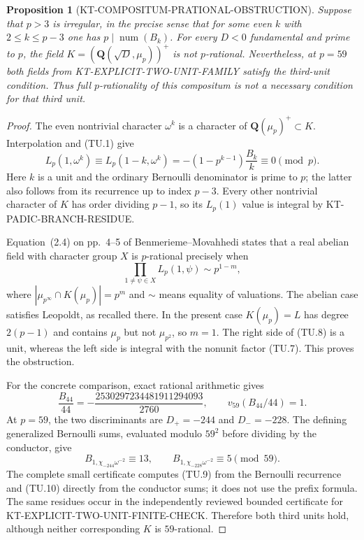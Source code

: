 \documentclass[11pt,a4paper]{article}
\newtheorem{proposition}[theorem]{Proposition}
\theoremstyle{definition}
\begin{document}
\begin{proposition}[KT-COMPOSITUM-PRATIONAL-OBSTRUCTION]
Suppose that $p>3$ is irregular, in the precise sense that for
some even $k$ with $2\le k\le p-3$ one has
$p\mid\operatorname{num}(B_k)$.  For every $D<0$ fundamental
and prime to $p$, the field
$K=(\mathbf Q(\sqrt D,\mu_p))^+$ is not $p$-rational.
Nevertheless, at $p=59$ both fields from
KT-EXPLICIT-TWO-UNIT-FAMILY satisfy the third-unit condition.
Thus full $p$-rationality of this compositum is not a necessary
condition for that third unit.
\end{proposition}
\begin{proof}
The even nontrivial character $\omega^k$ is a character of
$\mathbf Q(\mu_p)^+\subset K$.  Interpolation and (TU.1) give
\[
 L_p(1,\omega^k)\equiv L_p(1-k,\omega^k)
       =-(1-p^{k-1})\frac{B_k}{k}\equiv0\pmod p.          \tag{TU.7}
\]
Here $k$ is a unit and the ordinary Bernoulli denominator is
prime to $p$; the latter also follows from its recurrence up
to index $p-3$.  Every other nontrivial character of $K$ has
order dividing $p-1$, so its $L_p(1)$ value is integral by
KT-PADIC-BRANCH-RESIDUE.

Equation~(2.4) on pp.~4--5 of Benmerieme--Movahhedi states
that a real abelian field with character group $X$ is
$p$-rational precisely when
\[
             \prod_{1\ne\psi\in X}L_p(1,\psi)
                     \sim p^{1-m},                       \tag{TU.8}
\]
where $|\mu_{p^\infty}\cap K(\mu_p)|=p^m$ and $\sim$
means equality of valuations.  The abelian case satisfies
Leopoldt, as recalled there.  In the present case
$K(\mu_p)=L$ has degree $2(p-1)$ and contains $\mu_p$ but
not $\mu_{p^2}$, so $m=1$.  The right side of (TU.8) is a
unit, whereas the left side is integral with the nonunit
factor (TU.7).  This proves the obstruction.

For the concrete comparison, exact rational arithmetic gives
\[
 \frac{B_{44}}{44}
       =-\frac{2530297234481911294093}{2760},\qquad
       v_{59}(B_{44}/44)=1.                                \tag{TU.9}
\]
At $p=59$, the two discriminants are $D_+=-244$ and
$D_-=-228$.  The defining generalized Bernoulli sums, evaluated
modulo $59^2$ before dividing by the conductor, give
\[
 B_{1,\chi_{-244}\omega^{-2}}\equiv13,\qquad
 B_{1,\chi_{-228}\omega^{-2}}\equiv5\pmod{59}.             \tag{TU.10}
\]
The complete small certificate
 computes (TU.9)
from the Bernoulli recurrence and (TU.10) directly from the
conductor sums; it does not use the prefix formula.  The
same residues occur in the independently reviewed bounded
certificate for KT-EXPLICIT-TWO-UNIT-FINITE-CHECK.  Therefore
both third units hold, although neither corresponding $K$
is $59$-rational.
\end{proof}
\end{document}
